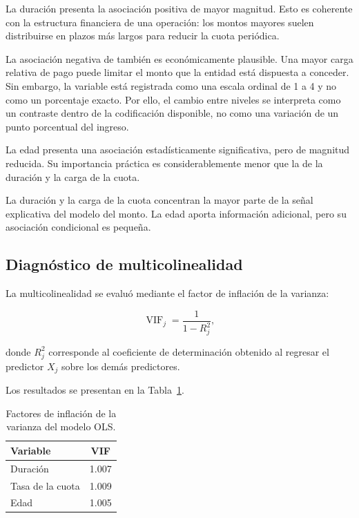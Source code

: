 La duración presenta la asociación positiva de mayor magnitud. Esto es
coherente con la estructura financiera de una operación: los montos
mayores suelen distribuirse en plazos más largos para reducir la cuota
periódica.

La asociación negativa de  también es
económicamente plausible. Una mayor carga relativa de pago puede limitar
el monto que la entidad está dispuesta a conceder. Sin embargo, la
variable está registrada como una escala ordinal de 1 a 4 y no como un
porcentaje exacto. Por ello, el cambio entre niveles se interpreta como
un contraste dentro de la codificación disponible, no como una variación
de un punto porcentual del ingreso.

La edad presenta una asociación estadísticamente significativa, pero de
magnitud reducida. Su importancia práctica es considerablemente menor
que la de la duración y la carga de la cuota.

\begin{hallazgo}
La duración y la carga de la cuota concentran la mayor parte de la
señal explicativa del modelo del monto. La edad aporta información
adicional, pero su asociación condicional es pequeña.
\end{hallazgo}

\subsection{Diagnóstico de multicolinealidad}

La multicolinealidad se evaluó mediante el factor de inflación de la
varianza:

\[
\operatorname{VIF}_j
=
\frac{1}{1-R_j^2},
\]

donde \(R_j^2\) corresponde al coeficiente de determinación obtenido al
regresar el predictor \(X_j\) sobre los demás predictores.

Los resultados se presentan en la
Tabla~\ref{tab:vif-ols}.

\begin{table}[H]
    \centering
    \caption{Factores de inflación de la varianza del modelo OLS.}
    \label{tab:vif-ols}

    \begin{tabular}{lc}
        \toprule
        Variable & VIF \\
        \midrule
        Duración & \num{1.007} \\
        Tasa de la cuota & \num{1.009} \\
        Edad & \num{1.005} \\
        \bottomrule
    \end{tabular}
\end{table}

